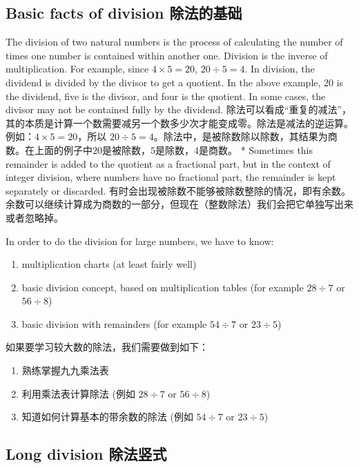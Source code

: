 \subsection{Basic facts of division 除法的基础}
\begin{paracol}{2}
The division of two natural numbers is the process of calculating the number of times one number is contained within another one. Division is the inverse of multiplication. For example, since $4\times 5 = 20$, $20\div 5 = 4$. In division, the dividend is divided by the divisor to get a quotient. In the above example, 20 is the dividend, five is the divisor, and four is the quotient. In some cases, the divisor may not be contained fully by the dividend. 
\switchcolumn[1]
除法可以看成“重复的减法”，其的本质是计算一个数需要减另一个数多少次才能变成零。除法是减法的逆运算。例如：$4\times 5 = 20$，所以 $20\div 5 = 4$。除法中，是被除数除以除数，其结果为商数。在上面的例子中$20$是被除数，$5$是除数，$4$是商数。
\switchcolumn[0]*
Sometimes this remainder is added to the quotient as a fractional part, but in the context of integer division, where numbers have no fractional part, the remainder is kept separately or discarded.
\switchcolumn[1]
有时会出现被除数不能够被除数整除的情况，即有余数。余数可以继续计算成为商数的一部分，但现在（整数除法）我们会把它单独写出来或者忽略掉。
\end{paracol}

\begin{paracol}{2}
In order to do the division for large numbers, we have to know:
\begin{enumerate}
\item multiplication charts (at least fairly well)
\item basic division concept, based on multiplication tables (for example $28 \div 7$ or $56 \div 8$)
\item basic division with remainders (for example $54 \div 7$ or $23 \div 5$)
\end{enumerate}
\switchcolumn[1]
如果要学习较大数的除法，我们需要做到如下：
\begin{enumerate}
\item 熟练掌握九九乘法表
\item 利用乘法表计算除法 (例如 $28 \div 7$ or $56 \div 8$)
\item 知道如何计算基本的带余数的除法 (例如 $54 \div 7$ or $23 \div 5$)
\end{enumerate}
\end{paracol}

\subsection{Long division  除法竖式}

